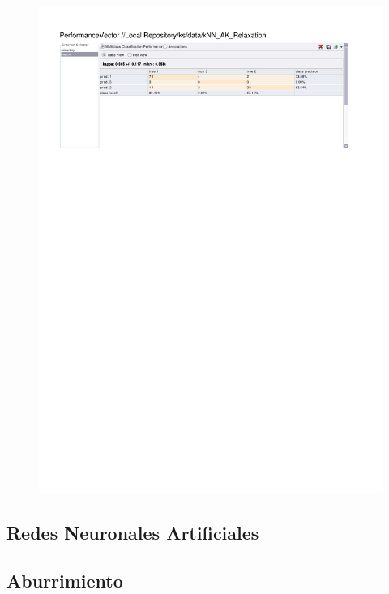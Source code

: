 \begin{figure}[htp]
  \centerline{\includegraphics[trim=0 680 0 60,clip,width=16.09cm]{results/kNN_K_Relaxation.pdf}} \caption{
} \label{kNN_K_Relaxation}
\end{figure}

\clearpage
\FloatBarrier
\subsection{Redes Neuronales Artificiales}
\subsection{Aburrimiento}


